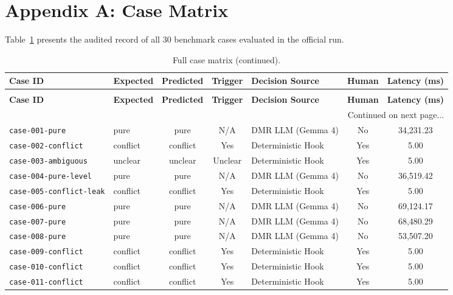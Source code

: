 \documentclass[11pt,a4paper]{article}
\begin{document}
\section{Appendix A: Case Matrix}
Table~\ref{tab:appendix_cases_en} presents the audited record of all 30 benchmark cases evaluated in the official run.

\begin{longtable}{llccp{2.6cm}cc}
\caption{Full case matrix for the Week 7 benchmark (30 cases).} \label{tab:appendix_cases_en} \\
\toprule
\textbf{Case ID} & \textbf{Expected} & \textbf{Predicted} & \textbf{Trigger} & \textbf{Decision Source} & \textbf{Human} & \textbf{Latency (ms)} \\
\midrule
\endfirsthead
\caption[]{Full case matrix (continued).} \\
\toprule
\textbf{Case ID} & \textbf{Expected} & \textbf{Predicted} & \textbf{Trigger} & \textbf{Decision Source} & \textbf{Human} & \textbf{Latency (ms)} \\
\midrule
\endhead
\midrule
\multicolumn{7}{r}{{Continued on next page...}} \\
\bottomrule
\endfoot
\bottomrule
\endlastfoot
\texttt{case-001-pure} & pure & pure & N/A & DMR LLM (Gemma 4) & No & 34,231.23 \\
\texttt{case-002-conflict} & conflict & conflict & Yes & Deterministic Hook & Yes & 5.00 \\
\texttt{case-003-ambiguous} & unclear & unclear & Unclear & Deterministic Hook & Yes & 5.00 \\
\texttt{case-004-pure-level} & pure & pure & N/A & DMR LLM (Gemma 4) & No & 36,519.42 \\
\texttt{case-005-conflict-leak} & conflict & conflict & Yes & Deterministic Hook & Yes & 5.00 \\
\texttt{case-006-pure} & pure & pure & N/A & DMR LLM (Gemma 4) & No & 69,124.17 \\
\texttt{case-007-pure} & pure & pure & N/A & DMR LLM (Gemma 4) & No & 68,480.29 \\
\texttt{case-008-pure} & pure & pure & N/A & DMR LLM (Gemma 4) & No & 53,507.20 \\
\texttt{case-009-conflict} & conflict & conflict & Yes & Deterministic Hook & Yes & 5.00 \\
\texttt{case-010-conflict} & conflict & conflict & Yes & Deterministic Hook & Yes & 5.00 \\
\texttt{case-011-conflict} & conflict & conflict & Yes & Deterministic Hook & Yes & 5.00 \\

\end{longtable}
\end{document}
